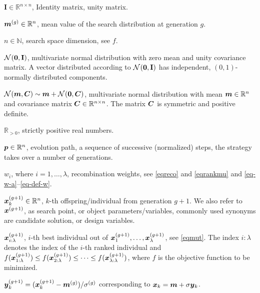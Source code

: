 \documentclass{article} %
\newcommand{\R}{\mathbb{R}}
\newcommand{\kom}[1]{}
\newcommand{\ve}[1]{\mathchoice{\mbox{\boldmath$\displaystyle#1$}}
  {\mbox{\boldmath$\textstyle#1$}} {\mbox{\boldmath$\scriptstyle#1$}}
  {\mbox{\boldmath$\scriptscriptstyle#1$}}}
\newcommand{\ma}[1]{\mathchoice{\mbox{\boldmath$\displaystyle#1$}}
  {\mbox{\boldmath$\textstyle#1$}} {\mbox{\boldmath$\scriptstyle#1$}}
  {\mbox{\boldmath$\scriptscriptstyle#1$}}}
\newcommand{\N}{\ensuremath{n}}
\newcommand{\Nat}{\mathbb{N}}
\newcommand{\Rn}{\R^{\N}}
\newcommand{\lam}{\ensuremath{\lambda}}
\newcommand{\sig}{\ensuremath{\sigma}}
\newcommand{\sigg}{\sigma^{(g)}}
\newcommand{\xgg}{\ve{x}^{(g+1)}}
\newcommand{\xbestg}{\ve{x}_{1:\lam}^{(g)}}
\newcommand{\x}{\ve{x}}
\newcommand{\y}{\ve{y}}
\newcommand{\ygg}{\y^{(g+1)}}
\newcommand{\Normal}[1]{{\mathcal N}\hspace{-0.13em}\left(#1\right)}
\newcommand{\Id}{\mathbf{I}}
\newcommand{\NormalNullI}{{\mathcal N}
        \hspace{-0.13em}\left({\ve{0},\Id}\right)}
\newcommand{\xmean}{\ensuremath{\ve{m}}}
\newcommand{\xmeang}{\ensuremath{\xmean^{(g)}}}
\begin{document}
\begin{description}
\item $\Id\in\R^{\N\times\N}$, Identity matrix, unity matrix. 
\item{$\xmeang\in\Rn$, mean value of the search
  distribution at generation $g$. }
\item $\N\in\Nat$, search space dimension, see $f$.
\item $\NormalNullI$, multivariate normal distribution with zero mean
  and unity covariance matrix. A vector distributed according to
  $\NormalNullI$ has independent, $(0,1)$-normally distributed
  components.
\item $\Normal{\xmean,\ma{C}}\sim\xmean+\Normal{\ve{0},\ma{C}}$,
  multivariate normal distribution with mean $\xmean\in\Rn$ and
  covariance matrix $\ma{C}\in\R^{\N\times\N}$. The matrix $\ma{C}$ is
  symmetric and positive definite.
\item{$\R_{>0}$, strictly positive real numbers. }
\item{$\ve{p}\in\Rn$, evolution path, a sequence of successive
    (normalized) steps, the strategy takes over a number of
    generations. }
\item{$w_i$, where $i=1,\dots,\lam$, recombination weights, see \eqref{eqreco} and \eqref{eqrankmu} and \eqref{eq-w-a}--\eqref{eq-def-w}.}
\item{$\xgg_k\in\Rn$, $k$-th offspring/individual from generation
    $g+1$. We also refer to $\xgg$, as search point, or object
    parameters/variables, commonly used synonyms are candidate
    solution, or design variables. }
%
\item{$\xgg_{i:\lam}$, $i$-th best individual out of
  $\xgg_1,\dots,\xgg_\lam$, see \eqref{eqmut}. The index
  \mbox{$i:\lam$} denotes the index of the $i$-th ranked individual
  and $f(\xgg_{1:\lam})\le f(\xgg_{2:\lam})\le\dots\le
  f(\xgg_{\lam:\lam})$, where $f$ is the objective function to be
  minimized.}
\item $\ygg_k=(\xgg_k - \xmeang) / \sigg$ corresponding to $\x_k = \xmean + \sig\y_k$. 
%
\end{description}
\end{document}
